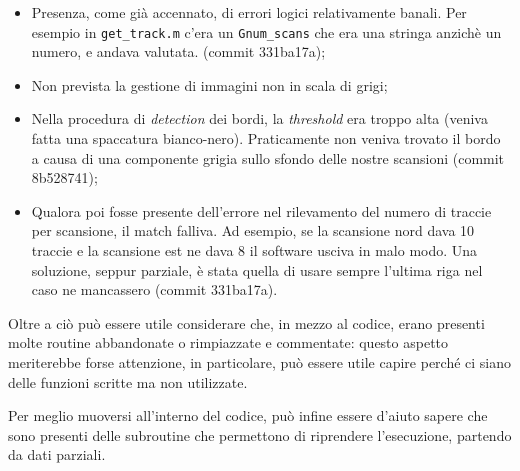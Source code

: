\begin{itemize}
\item Presenza, come già accennato, di errori logici relativamente banali. 
Per esempio in \texttt{get\_track.m} c'era un \texttt{Gnum\_scans} che era 
una stringa anzichè un numero, e andava valutata. (commit 331ba17a);
\item Non prevista la gestione di immagini non in scala di grigi;
\item Nella procedura di \emph{detection} dei bordi, la
\emph{threshold} era troppo alta (veniva fatta una spaccatura bianco-nero). 
Praticamente non veniva trovato il bordo a causa di una componente
grigia sullo sfondo delle nostre scansioni (commit 8b528741);
\item Qualora poi fosse presente dell'errore nel rilevamento del numero 
di traccie 
per scansione, il match falliva. Ad esempio, se la scansione nord 
dava 10 traccie e la scansione est ne dava 8 il software usciva in malo
modo. Una soluzione, seppur parziale, è stata quella di usare 
sempre l'ultima riga nel caso ne mancassero (commit 331ba17a).
\end{itemize}

Oltre a ciò può essere utile considerare che, in mezzo al codice, erano
presenti molte routine abbandonate o rimpiazzate e commentate: questo 
aspetto meriterebbe forse attenzione, in particolare, può essere utile
capire perché ci siano delle funzioni scritte ma non utilizzate.

Per meglio muoversi all'interno del codice, può infine essere d'aiuto
sapere che sono presenti delle subroutine che permettono di riprendere 
l'esecuzione, partendo da dati parziali.
